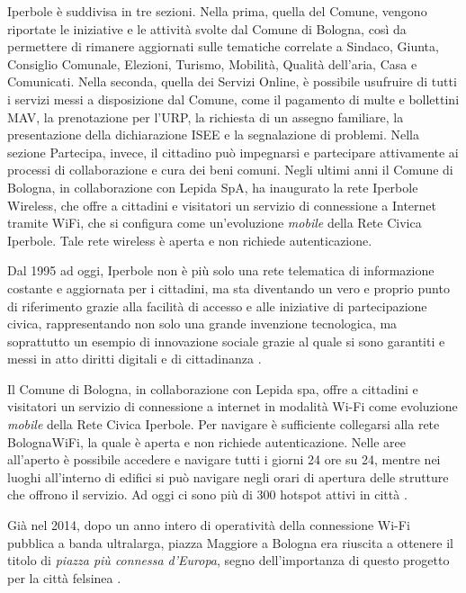 Iperbole è suddivisa in tre sezioni. Nella prima, quella del Comune, vengono riportate le iniziative e le attività svolte dal Comune di Bologna, così da permettere di rimanere aggiornati sulle tematiche correlate a Sindaco, Giunta, Consiglio Comunale, Elezioni, Turismo, Mobilità, Qualità dell'aria, Casa e Comunicati.
Nella seconda, quella dei Servizi Online, è possibile usufruire di tutti i servizi messi a disposizione dal Comune, come il pagamento di multe e bollettini MAV, la prenotazione per l'URP, la richiesta di un assegno familiare, la presentazione della dichiarazione ISEE e la segnalazione di problemi.
Nella sezione Partecipa, invece, il cittadino può impegnarsi e partecipare attivamente ai processi di collaborazione e cura dei beni comuni.
Negli ultimi anni il Comune di Bologna, in collaborazione con Lepida SpA, ha inaugurato la rete Iperbole Wireless, che offre a cittadini e visitatori un servizio di connessione a Internet tramite WiFi, che si configura come un'evoluzione \textit{mobile} della Rete Civica Iperbole. Tale rete wireless è aperta e non richiede autenticazione.

Dal 1995 ad oggi, Iperbole non è più solo una rete telematica di informazione costante e aggiornata per i cittadini, ma sta diventando un vero e proprio punto di riferimento grazie alla facilità di accesso e alle iniziative di partecipazione civica, rappresentando non solo una grande invenzione tecnologica, ma soprattutto un esempio di innovazione sociale grazie al quale si sono garantiti e messi in atto diritti digitali e di cittadinanza \cite{Iperbole_Citta_Connessa}.

Il Comune di Bologna, in collaborazione con Lepida spa, offre a cittadini e visitatori un servizio di connessione a internet in modalità Wi-Fi come evoluzione \textit{mobile} della Rete Civica Iperbole. Per navigare è sufficiente collegarsi alla rete BolognaWiFi, la quale è aperta e non richiede autenticazione. Nelle aree all'aperto è possibile accedere e navigare tutti i giorni 24 ore su 24, mentre nei luoghi all'interno di edifici si può navigare negli orari di apertura delle strutture che offrono il servizio. Ad oggi ci sono più di 300 hotspot attivi in città \cite{BolognaWiFi_Elenco_Hotspot}.


Già nel 2014, dopo un anno intero di operatività della connessione Wi-Fi pubblica a banda ultralarga, piazza Maggiore a Bologna era riuscita a ottenere il titolo di \textit{piazza più connessa d'Europa}, segno dell'importanza di questo progetto per la città felsinea \cite{Smart_City_Piazza_Connessa_Europa}.

